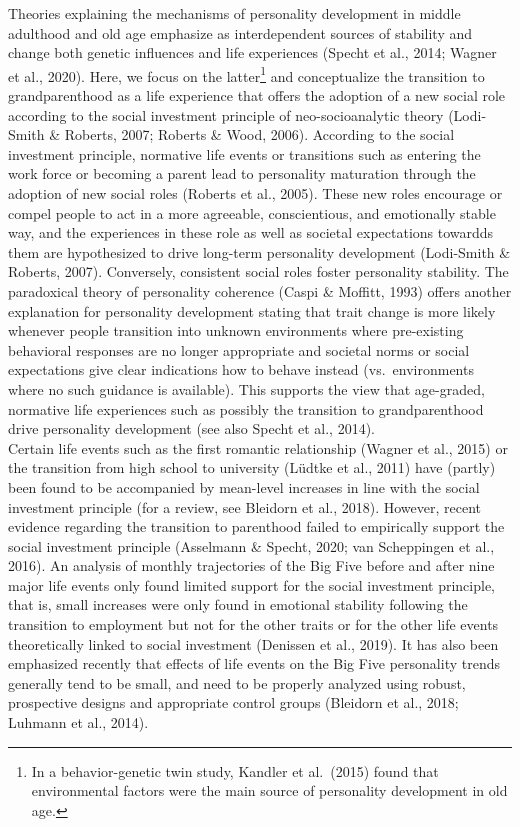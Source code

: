 \documentclass[
  english,
  man, noextraspace]{apa7}
\begin{document}
Theories explaining the mechanisms of personality development in middle adulthood and old age emphasize as interdependent sources of stability and change both genetic influences and life experiences (Specht et al., 2014; Wagner et al., 2020). Here, we focus on the latter\footnote{In a behavior-genetic twin study, Kandler et al.~(2015) found that environmental factors were the main source of personality development in old age.} and conceptualize the transition to grandparenthood as a life experience that offers the adoption of a new social role according to the social investment principle of neo-socioanalytic theory (Lodi-Smith \& Roberts, 2007; Roberts \& Wood, 2006). According to the social investment principle, normative life events or transitions such as entering the work force or becoming a parent lead to personality maturation through the adoption of new social roles (Roberts et al., 2005). These new roles encourage or compel people to act in a more agreeable, conscientious, and emotionally stable way, and the experiences in these role as well as societal expectations towardds them are hypothesized to drive long-term personality development (Lodi-Smith \& Roberts, 2007). Conversely, consistent social roles foster personality stability. The paradoxical theory of personality coherence (Caspi \& Moffitt, 1993) offers another explanation for personality development stating that trait change is more likely whenever people transition into unknown environments where pre-existing behavioral responses are no longer appropriate and societal norms or social expectations give clear indications how to behave instead (vs.~environments where no such guidance is available). This supports the view that age-graded, normative life experiences such as possibly the transition to grandparenthood drive personality development (see also Specht et al., 2014).\\
Certain life events such as the first romantic relationship (Wagner et al., 2015) or the transition from high school to university (Lüdtke et al., 2011) have (partly) been found to be accompanied by mean-level increases in line with the social investment principle (for a review, see Bleidorn et al., 2018). However, recent evidence regarding the transition to parenthood failed to empirically support the social investment principle (Asselmann \& Specht, 2020; van Scheppingen et al., 2016). An analysis of monthly trajectories of the Big Five before and after nine major life events only found limited support for the social investment principle, that is, small increases were only found in emotional stability following the transition to employment but not for the other traits or for the other life events theoretically linked to social investment (Denissen et al., 2019). It has also been emphasized recently that effects of life events on the Big Five personality trends generally tend to be small, and need to be properly analyzed using robust, prospective designs and appropriate control groups (Bleidorn et al., 2018; Luhmann et al., 2014).\\
\end{document}
